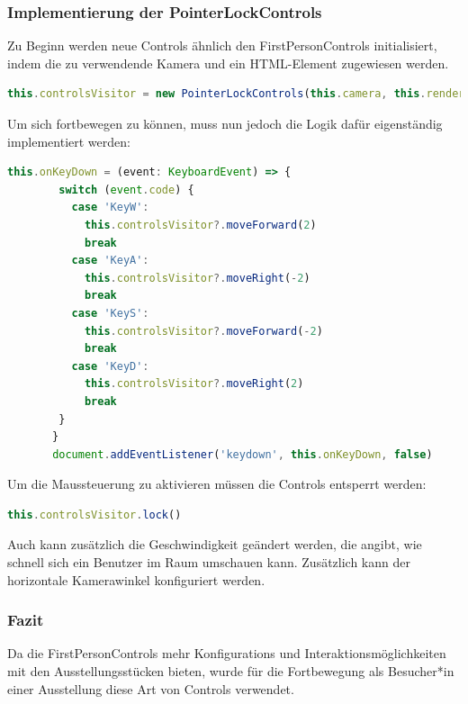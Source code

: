 \subsubsection{Implementierung der PointerLockControls}

Zu Beginn werden neue Controls ähnlich den FirstPersonControls initialisiert, indem die zu verwendende Kamera und ein HTML-Element zugewiesen werden.
\begin{lstlisting}[caption={PointerLockControls initialisieren},language=TypeScript]
    this.controlsVisitor = new PointerLockControls(this.camera, this.renderer.domElement)
    \end{lstlisting}

Um sich fortbewegen zu können, muss nun jedoch die Logik dafür eigenständig implementiert werden: 

\begin{lstlisting}[caption={Logik der PointerLockControls},language=TypeScript]
    this.onKeyDown = (event: KeyboardEvent) => {
        switch (event.code) {
          case 'KeyW':
            this.controlsVisitor?.moveForward(2)
            break
          case 'KeyA':
            this.controlsVisitor?.moveRight(-2)
            break
          case 'KeyS':
            this.controlsVisitor?.moveForward(-2)
            break
          case 'KeyD':
            this.controlsVisitor?.moveRight(2)
            break
        }
       }
       document.addEventListener('keydown', this.onKeyDown, false)
    \end{lstlisting}

Um die Maussteuerung zu aktivieren müssen die Controls entsperrt werden:

\begin{lstlisting}[caption={Controls entsperren},language=TypeScript]
    this.controlsVisitor.lock()
    \end{lstlisting}

Auch kann zusätzlich die Geschwindigkeit geändert werden, die angibt, wie schnell sich ein Benutzer im Raum umschauen kann. Zusätzlich kann der horizontale Kamerawinkel konfiguriert werden.

\subsubsection{Fazit}
Da die FirstPersonControls mehr Konfigurations und Interaktionsmöglichkeiten mit den Ausstellungsstücken bieten, wurde für die Fortbewegung als Besucher*in einer Ausstellung diese Art von Controls verwendet.\cite{PointerLockControls}


